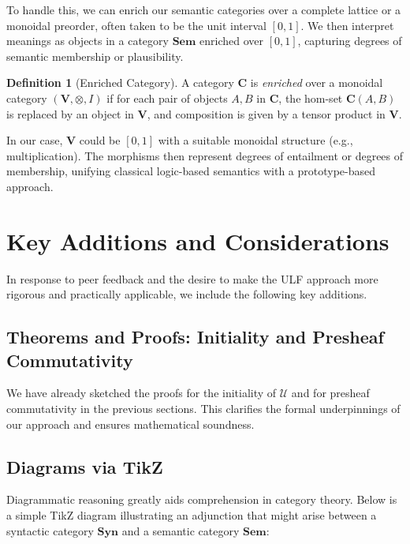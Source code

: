 \documentclass[12pt]{article}
\theoremstyle{plain}
\theoremstyle{definition}
\newtheorem{definition}{Definition}
\begin{document}
To handle this, we can enrich our semantic categories over a complete lattice or a monoidal preorder, often taken to be the unit interval \([0,1]\). We then interpret meanings as objects in a category \(\mathbf{Sem}\) enriched over \([0,1]\), capturing degrees of semantic membership or plausibility.

\begin{definition}[Enriched Category]
A category \(\mathbf{C}\) is \emph{enriched} over a monoidal category \((\mathbf{V}, \otimes, I)\) if for each pair of objects \(A, B\) in \(\mathbf{C}\), the hom-set \(\mathbf{C}(A,B)\) is replaced by an object in \(\mathbf{V}\), and composition is given by a tensor product in \(\mathbf{V}\).
\end{definition}

In our case, \(\mathbf{V}\) could be \([0,1]\) with a suitable monoidal structure (e.g., multiplication). The morphisms then represent degrees of entailment or degrees of membership, unifying classical logic-based semantics with a prototype-based approach.

\section{Key Additions and Considerations}
In response to peer feedback and the desire to make the ULF approach more rigorous and practically applicable, we include the following key additions.

\subsection{Theorems and Proofs: Initiality and Presheaf Commutativity}
We have already sketched the proofs for the initiality of \(\mathcal{U}\) and for presheaf commutativity in the previous sections. This clarifies the formal underpinnings of our approach and ensures mathematical soundness.

\subsection{Diagrams via TikZ}
Diagrammatic reasoning greatly aids comprehension in category theory. Below is a simple TikZ diagram illustrating an adjunction that might arise between a syntactic category \(\mathbf{Syn}\) and a semantic category \(\mathbf{Sem}\):

\begin{center}
\end{center}
\end{document}
